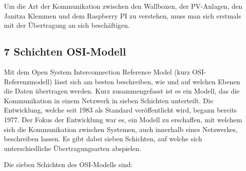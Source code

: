 \label{ModbusErklärung} 
Um die Art der Kommunikation zwischen den Wallboxen, der PV-Anlagen, den Janitza Klemmen und dem Raspberry PI zu verstehen, muss man sich erstmals mit der Übertragung an sich beschäftigen.
\subsection{7 Schichten OSI-Modell} \label{OsiModell}

Mit dem Open System Interconnection Reference Model (kurz OSI-Referenzmodell) lässt sich am besten beschreiben, wie und auf welchen Ebenen die Daten übertragen werden.  Kurz zusammengefasst ist es ein Modell, das die Kommunikation in einem Netzwerk in sieben Schichten unterteilt. Die Entwicklung, welche seit 1983 als Standard veröffentlicht wird, begann bereits 1977.  Der Fokus der Entwicklung war es, ein Modell zu erschaffen, mit welchem sich die Kommunikation zwischen Systemen, auch innerhalb eines Netzwerkes, beschreiben lassen. Es gibt dabei sieben Schichten, auf welche sich unterschiedliche Übertragungsarten abspielen. 

Die sieben Schichten des OSI-Modells sind:  

